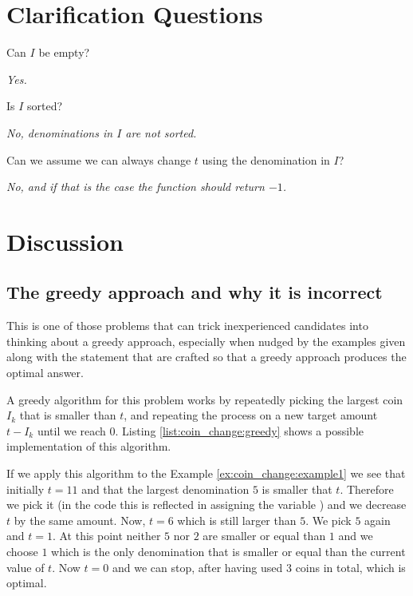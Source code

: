 \section{Clarification Questions}

\begin{QandA}

	\item Can $I$ be empty?
	\begin{answered}
		\textit{Yes.}
	\end{answered}

	\item Is $I$ sorted?
	\begin{answered}
		\textit{No, denominations in $I$ are not sorted.}
	\end{answered}

	\item Can we assume we can always change $t$ using the denomination in $I$?
	\begin{answered}
		\textit{No, and if that is the case the function should return $-1$.}
	\end{answered}
	
\end{QandA}

\section{Discussion}
\label{coin_change:sec:discussion}

\subsection{The greedy approach and why it is incorrect}
This is one of those problems that can trick inexperienced candidates into thinking about a greedy approach, especially when nudged by the examples given along with the statement that are crafted so that a greedy approach produces the optimal answer.

A greedy algorithm for this problem works by repeatedly picking the largest coin $I_k$ that is smaller than $t$, and repeating the process on a new target amount $t-I_k$ until we reach $0$.
Listing \ref{list:coin_change:greedy} shows a possible implementation of this algorithm.

If we apply this algorithm to the Example \ref{ex:coin_change:example1}  we see that initially $t=11$
and that the largest denomination $5$ is smaller that $t$. Therefore we pick it (in the code this is reflected in assigning the variable ) and we decrease $t$ by the same amount.
Now, $t=6$ which is still larger than $5$. We pick $5$ again and $t = 1$.
At this point neither $5$ nor $2$ are smaller or equal than $1$ and we choose $1$ which is the only denomination that is smaller or equal than the current value of $t$.
Now $t=0$ and we can stop, after having used $3$ coins in total, which is optimal.

